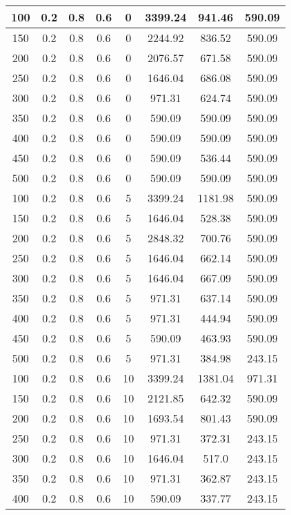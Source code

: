 \documentclass[a4paper, 12pt]{extreport}
\begin{document}
\begin{itemize}
\begin{longtable}{|c|c|c|c|c|c|c|c|}
			100 & 0.2 & 0.8 & 0.6 & 0 & 3399.24 & 941.46 & 590.09 \\\hline
			150 & 0.2 & 0.8 & 0.6 & 0 & 2244.92 & 836.52 & 590.09 \\\hline
			200 & 0.2 & 0.8 & 0.6 & 0 & 2076.57 & 671.58 & 590.09 \\\hline
			250 & 0.2 & 0.8 & 0.6 & 0 & 1646.04 & 686.08 & 590.09 \\\hline
			300 & 0.2 & 0.8 & 0.6 & 0 & 971.31 & 624.74 & 590.09 \\\hline
			350 & 0.2 & 0.8 & 0.6 & 0 & 590.09 & 590.09 & 590.09 \\\hline
			400 & 0.2 & 0.8 & 0.6 & 0 & 590.09 & 590.09 & 590.09 \\\hline
			450 & 0.2 & 0.8 & 0.6 & 0 & 590.09 & 536.44 & 590.09 \\\hline
			500 & 0.2 & 0.8 & 0.6 & 0 & 590.09 & 590.09 & 590.09 \\\hline
			100 & 0.2 & 0.8 & 0.6 & 5 & 3399.24 & 1181.98 & 590.09 \\\hline
			150 & 0.2 & 0.8 & 0.6 & 5 & 1646.04 & 528.38 & 590.09 \\\hline
			200 & 0.2 & 0.8 & 0.6 & 5 & 2848.32 & 700.76 & 590.09 \\\hline
			250 & 0.2 & 0.8 & 0.6 & 5 & 1646.04 & 662.14 & 590.09 \\\hline
			300 & 0.2 & 0.8 & 0.6 & 5 & 1646.04 & 667.09 & 590.09 \\\hline
			350 & 0.2 & 0.8 & 0.6 & 5 & 971.31 & 637.14 & 590.09 \\\hline
			400 & 0.2 & 0.8 & 0.6 & 5 & 971.31 & 444.94 & 590.09 \\\hline
			450 & 0.2 & 0.8 & 0.6 & 5 & 590.09 & 463.93 & 590.09 \\\hline
			500 & 0.2 & 0.8 & 0.6 & 5 & 971.31 & 384.98 & 243.15 \\\hline
			100 & 0.2 & 0.8 & 0.6 & 10 & 3399.24 & 1381.04 & 971.31 \\\hline
			150 & 0.2 & 0.8 & 0.6 & 10 & 2121.85 & 642.32 & 590.09 \\\hline
			200 & 0.2 & 0.8 & 0.6 & 10 & 1693.54 & 801.43 & 590.09 \\\hline
			250 & 0.2 & 0.8 & 0.6 & 10 & 971.31 & 372.31 & 243.15 \\\hline
			300 & 0.2 & 0.8 & 0.6 & 10 & 1646.04 & 517.0 & 243.15 \\\hline
			350 & 0.2 & 0.8 & 0.6 & 10 & 971.31 & 362.87 & 243.15 \\\hline
			400 & 0.2 & 0.8 & 0.6 & 10 & 590.09 & 337.77 & 243.15 \\\hline

\end{longtable}
\end{itemize}
\end{document}
